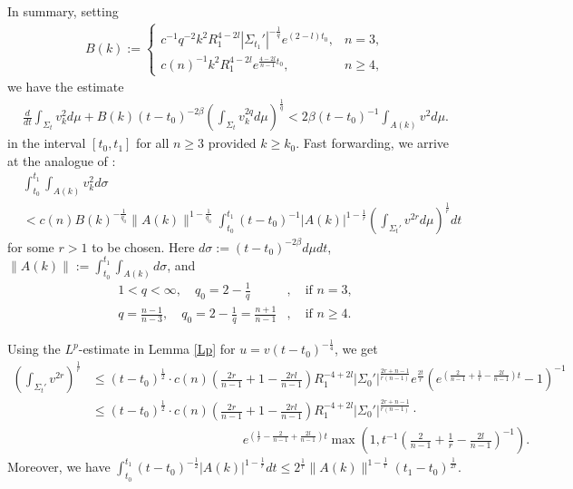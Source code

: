 \documentclass[12pt,twoside]{article}
\theoremstyle{plain}
\theoremstyle{definition}
\theoremstyle{remark}
\newcommand{\lt}{\left}
\newcommand{\rt}{\right}
\numberwithin{equation}{section}
\begin{document}
In summary, setting 
\begin{align*}
B(k) := \begin{cases}
c^{-1} q^{-2} k^2 R_1^{4-2l} |\Sigma_{t_1}'|^{-\frac{1}{q}} e^{(2-l)t_0}, & n=3,\\
c(n)^{-1} k^2 R_1^{4-2l} e^{\frac{4-2l}{n-1} t_0}, &n\ge 4,
\end{cases}
\end{align*} we have the estimate
\begin{align*}
\frac{d}{dt} \int_{\Sigma_t} v_k^2 d\mu + B(k) (t - t_0)^{-2\beta}  \lt( \int_{\Sigma_t} v_k^{2q} d\mu \rt)^\frac{1}{q} < 2\beta (t-t_0)^{-1} \int_{A(k)} v^2 d\mu.
\end{align*}
in the interval $[t_0,t_1]$ for all $n \ge 3$ provided $k \ge k_0$. Fast forwarding, we arrive at the analogue of \cite[(1.14)]{HI2}:
\begin{align*}
&\int_{t_0}^{t_1} \int_{A(k)} v_k^2 d\sigma\\
&< c(n) B(k)^{-\frac{1}{q_0}} \| A(k)\|^{1 - \frac{1}{q_0}} \int_{t_0}^{t_1} (t-t_0)^{-1} |A(k)|^{1-\frac{1}{r}} \lt( \int_{\Sigma_t'} v^{2r} d\mu \rt)^{\frac{1}{r}} dt
\end{align*}
for some $r>1$ to be chosen. Here $d\sigma := (t-t_0)^{-2\beta} d\mu dt$, $\| A(k) \| := \int_{t_0}^{t_1} \int_{A(k)} d\sigma$, and 
\begin{align*}
1 < q < \infty, \quad q_0 = 2 - \frac{1}{q}&, \quad \mbox{if } n=3,\\
q = \frac{n-1}{n-3}, \quad q_0 = 2 - \frac{1}{q} = \frac{n+1}{n-1}&, \quad \mbox{if } n \ge 4.
\end{align*}

Using the $L^p$-estimate in Lemma \ref{Lp} for $u = v (t-t_0)^{-\frac{1}{4}}$, we get
\begin{align*}
\lt( \int_{\Sigma_t'} v^{2r}\rt)^{\frac{1}{r}} &\le (t-t_0)^{\frac{1}{2}} \cdot c(n) \lt( \frac{2r}{n-1} + 1 - \frac{2rl}{n-1}\rt) R_1^{-4+2l} |\Sigma_0'|^{\frac{2r+n-1}{r(n-1)}} e^{\frac{2t}{r}} \lt( e^{(\frac{2}{n-1} + \frac{1}{r} - \frac{2l}{n-1})t} - 1 \rt)^{-1} \\
&\le (t-t_0)^{\frac{1}{2}} \cdot c(n) \lt( \frac{2r}{n-1} + 1 - \frac{2rl}{n-1}\rt) R_1^{-4+2l} |\Sigma_0'|^{\frac{2r+n-1}{r(n-1)}}  \cdot \\
& \hspace{5cm} e^{(\frac{1}{r} - \frac{2}{n-1} + \frac{2l}{n-1})t} \max \lt( 1, t^{-1} \lt( \frac{2}{n-1} + \frac{1}{r} - \frac{2l}{n-1} \rt)^{-1} \rt).
\end{align*}
Moreover, we have $\int_{t_0}^{t_1} (t-t_0)^{-\frac{1}{2}} |A(k)|^{1-\frac{1}{r}} dt \le 2^{\frac{1}{r}} \| A(k) \|^{1 - \frac{1}{r}} (t_1-t_0)^{\frac{1}{2r}}$.
\end{document}
